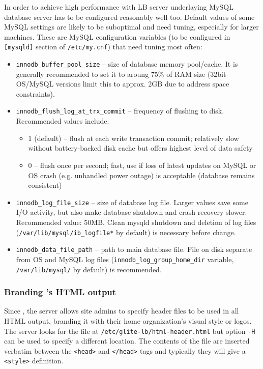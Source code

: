 In order to achieve high performance with LB server underlaying MySQL 
database server has to be configured reasonably well too. 
Default values of some MySQL settings are likely to be suboptimal
and need tuning, especially for larger machines.
These are MySQL configuration variables (to be configured in \texttt{[mysqld]} 
section of \texttt{/etc/my.cnf}) that need tuning most often:
\begin{itemize}
\item \texttt{innodb\_buffer\_pool\_size} -- size of database memory pool/cache. 
It is generally recommended to set it to aroung 75\% of RAM size
(32bit OS/MySQL versions limit this to approx. 2GB due to address space 
constraints).

\item \texttt{innodb\_flush\_log\_at\_trx\_commit} -- frequency of flushing to disk.
Recommended values include:
\begin{itemize}
\item 1 (default) -- flush at each write transaction commit; relatively
slow without battery-backed disk cache but offers highest level of data safety
\item 0 -- flush once per second; fast, use if loss of latest updates on MySQL
or OS crash (e.g. unhandled power outage) is acceptable (database remains consistent)
\end{itemize}

\item \texttt{innodb\_log\_file\_size} -- size of database log file. Larger values
save some I/O activity, but also make database shutdown and crash recovery slower.
Recommended value: 50MB. Clean mysqld shutdown and deletion of log files 
(\texttt{/var/lib/mysql/ib\_logfile*} by default) is necessary before change.

\item \texttt{innodb\_data\_file\_path} -- path to main database file. File on
disk separate from OS and MySQL log files (\texttt{innodb\_log\_group\_home\_dir} variable,
\texttt{/var/lib/mysql/} by default) is recommended.

\end{itemize}

\subsubsection{Branding \LB's HTML output}
\label{inst:branding}

Since , the server allows site admins to specify header files to be used in all HTML output, branding it with their home organization's visual style or logos. The server looks for the file at \texttt{/etc/glite-lb/html-header.html} but option \texttt{-H} can be used to specify a different location. The contents of the file are inserted verbatim between the \texttt{<head>} and \texttt{</head>} tags and typically they will give a \texttt{<style>} definition. 

